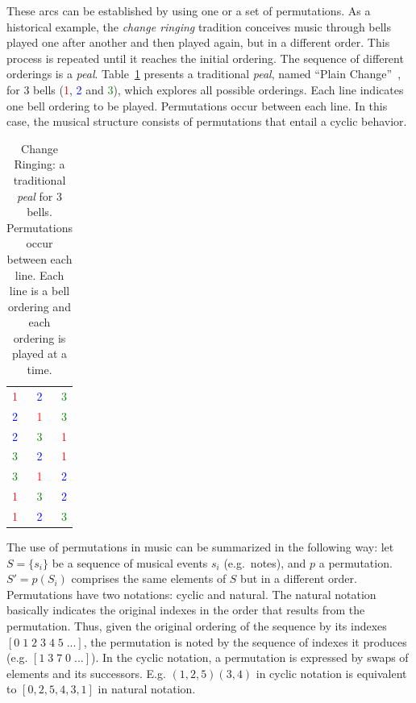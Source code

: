 These arcs can be established by using one or a set of permutations.
As a historical
example, the \emph{change ringing} tradition conceives music through
bells played one after another and then played again, but in a different
order. This process is repeated until it reaches the initial ordering. The sequence of
different orderings is a \emph{peal}. Table~\ref{tab:change}
presents a traditional \emph{peal}, named ``Plain Change''~\cite{change}, for 3 bells (\textcolor{red}{1}, \textcolor{blue}{2} and \textcolor{green}{3}), which explores
all possible orderings. Each line indicates one bell ordering to be
played. Permutations occur between each line. In this case, the musical structure
consists of permutations that entail a cyclic behavior.

\begin{table}[htp!]
\centering
\caption{Change Ringing: a traditional \emph{peal} for 3 bells. Permutations
occur between each line. Each line is a bell ordering and each ordering is played at a time.} 
\begin{tabular}{l c r}
\textcolor{red}{1} & \textcolor{blue}{2} & \textcolor{green}{3} \\
\textcolor{blue}{2} & \textcolor{red}{1} & \textcolor{green}{3} \\
\textcolor{blue}{2} & \textcolor{green}{3} & \textcolor{red}{1} \\
\textcolor{green}{3} & \textcolor{blue}{2} & \textcolor{red}{1} \\
\textcolor{green}{3} & \textcolor{red}{1} & \textcolor{blue}{2} \\
\textcolor{red}{1} & \textcolor{green}{3} & \textcolor{blue}{2} \\
\textcolor{red}{1} & \textcolor{blue}{2} & \textcolor{green}{3}
\end{tabular}
\label{tab:change}
\end{table}

The use of permutations in music can be summarized in the following way:
let $S=\{s_i\}$ be a sequence of musical events $s_i$ (e.g.\ notes), and $p$ a
permutation. $S'=p(S_i)$ comprises the same elements of $S$ but in a
different order. Permutations have two notations: cyclic and
natural. The natural notation basically indicates the original indexes in the order that results from
the permutation. Thus, given the original ordering of the sequence by its indexes $[0\;1\;2\;3\;4\;5\;...]$, the permutation is noted by the sequence of indexes it
produces (e.g. $[1\;3\;7\;0\;...]$).
In the cyclic notation, a permutation is expressed
by swaps of elements and its successors.
E.g. $(1,2,5)(3,4)$ in cyclic notation is equivalent to $[0,2,5,4,3,1]$ in natural notation.

